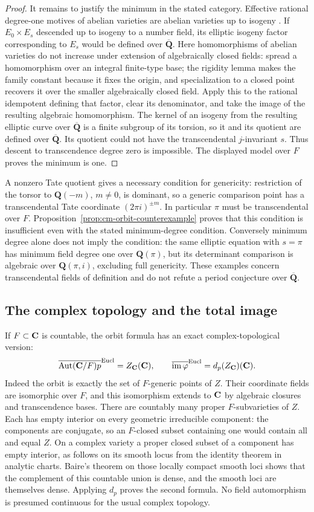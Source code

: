 \documentclass[11pt]{article}
\theoremstyle{definition}\newtheorem{definition}[theorem]{Definition}
\theoremstyle{remark}\newtheorem{remark}[theorem]{Remark}
\newcommand{\Q}{\mathbf Q}\newcommand{\Z}{\mathbf Z}
\newcommand{\Qb}{\overline{\mathbf Q}}\newcommand{\Fp}{\mathbf F_p}
\DeclareMathOperator{\Aut}{Aut}\DeclareMathOperator{\Isom}{Isom}
\begin{document}
\begin{proof}
It remains to justify the minimum in the stated category. Effective rational degree-one motives of abelian varieties are abelian varieties up to isogeny \cite[Proposition~6.21, p.~65]{DeligneMilne}. If $E_0\times E_s$ descended up to isogeny to a number field, its elliptic isogeny factor corresponding to $E_s$ would be defined over $\Qb$. Here homomorphisms of abelian varieties do not increase under extension of algebraically closed fields: spread a homomorphism over an integral finite-type base; the rigidity lemma makes the family constant because it fixes the origin, and specialization to a closed point recovers it over the smaller algebraically closed field. Apply this to the rational idempotent defining that factor, clear its denominator, and take the image of the resulting algebraic homomorphism. The kernel of an isogeny from the resulting elliptic curve over $\Qb$ is a finite subgroup of its torsion, so it and its quotient are defined over $\Qb$. Its quotient could not have the transcendental $j$-invariant $s$. Thus descent to transcendence degree zero is impossible. The displayed model over $F$ proves the minimum is one.
\end{proof}

A nonzero Tate quotient gives a necessary condition for genericity: restriction of the torsor to $\Q(-m)$, $m\ne0$, is dominant, so a generic comparison point has a transcendental Tate coordinate $(2\pi i)^{\pm m}$. In particular $\pi$ must be transcendental over $F$. Proposition~\ref{prop:cm-orbit-counterexample} proves that this condition is insufficient even with the stated minimum-degree condition. Conversely minimum degree alone does not imply the condition: the same elliptic equation with $s=\pi$ has minimum field degree one over $\Q(\pi)$, but its determinant comparison is algebraic over $\Q(\pi,i)$, excluding full genericity. These examples concern transcendental fields of definition and do not refute a period conjecture over $\Qb$.

\subsection{The complex topology and the total image}
If $F\subset\mathbf C$ is countable, the orbit formula has an exact complex-topological version:
\[
 \overline{\Aut(\C/F)p}^{\rm Eucl}=Z_\C(\C),\qquad
 \overline{\im\varphi}^{\rm Eucl}=d_p(Z_\C)(\C).
\]
Indeed the orbit is exactly the set of $F$-generic points of $Z$. Their coordinate fields are isomorphic over $F$, and this isomorphism extends to $\mathbf C$ by algebraic closures and transcendence bases. There are countably many proper $F$-subvarieties of $Z$. Each has empty interior on every geometric irreducible component: the components are conjugate, so an $F$-closed subset containing one would contain all and equal $Z$. On a complex variety a proper closed subset of a component has empty interior, as follows on its smooth locus from the identity theorem in analytic charts. Baire's theorem on those locally compact smooth loci shows that the complement of this countable union is dense, and the smooth loci are themselves dense. Applying $d_p$ proves the second formula. No field automorphism is presumed continuous for the usual complex topology.
\end{document}
